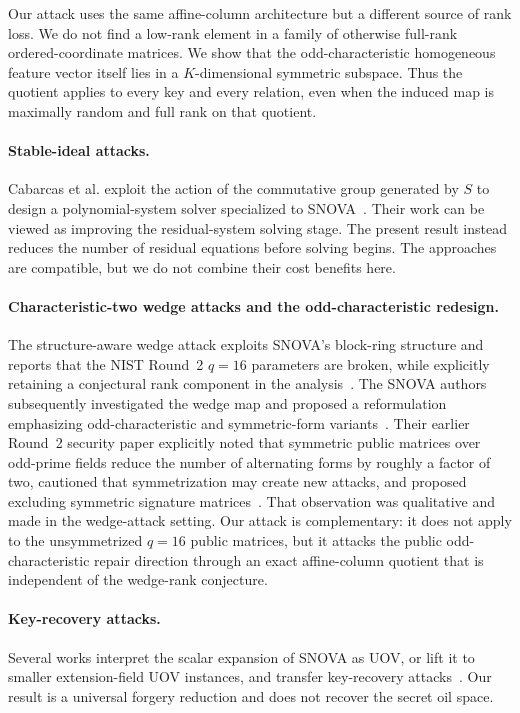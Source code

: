 \documentclass[11pt]{article}
\newcommand{\SNOVA}{\textsf{SNOVA}}
\begin{document}
Our attack uses the same affine-column architecture but a different source of rank loss.  We do not find a low-rank element in a family of otherwise full-rank ordered-coordinate matrices.  We show that the odd-characteristic homogeneous feature vector itself lies in a $K$-dimensional symmetric subspace.  Thus the quotient applies to every key and every relation, even when the induced map is maximally random and full rank on that quotient.

\paragraph{Stable-ideal attacks.}
Cabarcas et al. exploit the action of the commutative group generated by $S$ to design a polynomial-system solver specialized to \SNOVA{}~\cite{Cabarcas2025SNOVA}.  Their work can be viewed as improving the residual-system solving stage.  The present result instead reduces the number of residual equations before solving begins.  The approaches are compatible, but we do not combine their cost benefits here.

\paragraph{Characteristic-two wedge attacks and the odd-characteristic redesign.}
The structure-aware wedge attack exploits \SNOVA{}'s block-ring structure and reports that the NIST Round~2 $q=16$ parameters are broken, while explicitly retaining a conjectural rank component in the analysis~\cite{BrosEtAl2026SNOVAWedge}.  The \SNOVA{} authors subsequently investigated the wedge map and proposed a reformulation emphasizing odd-characteristic and symmetric-form variants~\cite{TsengEtAl2026Wedge,DingEtAl2026Reformulating}.  Their earlier Round~2 security paper explicitly noted that symmetric public matrices over odd-prime fields reduce the number of alternating forms by roughly a factor of two, cautioned that symmetrization may create new attacks, and proposed excluding symmetric signature matrices~\cite{WangEtAl2025Round2Security}.  That observation was qualitative and made in the wedge-attack setting.  Our attack is complementary: it does not apply to the unsymmetrized $q=16$ public matrices, but it attacks the public odd-characteristic repair direction through an exact affine-column quotient that is independent of the wedge-rank conjecture.

\paragraph{Key-recovery attacks.}
Several works interpret the scalar expansion of \SNOVA{} as UOV, or lift it to smaller extension-field UOV instances, and transfer key-recovery attacks~\cite{IkematsuAkiyama2024,LiDing2024,NakamuraEtAl2025}.  Our result is a universal forgery reduction and does not recover the secret oil space.
\end{document}
